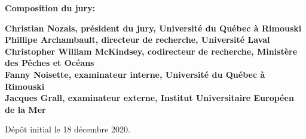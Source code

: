 \thispagestyle{empty}

\null
\vfill
\noindent \textbf{Composition du jury:}\\
\vspace{1cm}

\begin{singlespace}
  \noindent \textbf{Christian Nozais, président du jury, Université du Québec à Rimouski}\\

  \noindent \textbf{Phillipe Archambault, directeur de recherche, Université Laval}\\

  \noindent \textbf{Christopher William McKindsey, codirecteur de recherche, Ministère des Pêches et Océans}\\

  \noindent \textbf{Fanny Noisette, examinateur interne, Université du Québec à Rimouski}\\

  \noindent \textbf{Jacques Grall, examinateur externe, Institut Universitaire Européen de la Mer}\\
\end{singlespace}

\vspace{2cm}
\noindent Dépôt initial le 18 décembre 2020.
\hspace{3cm}


\cleardoublepage
